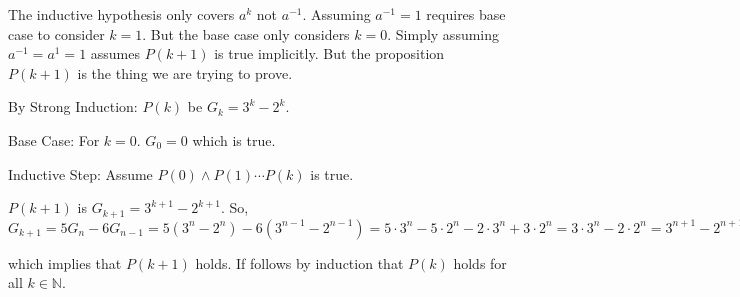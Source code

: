 \documentclass[titlepage,12pt]{book}
\begin{document}
\begin{solution}
    The inductive hypothesis only covers $a^{k}$ not $a^{-1}$.
    Assuming $a^{-1} = 1$ requires base case to consider $k = 1$.
    But the base case only considers $k = 0$.
    Simply assuming $a^{-1} = a^{1} = 1$ assumes $P(k + 1)$ is true implicitly.
    But the proposition $P(k + 1)$ is the thing we are trying to prove.
\end{solution}

\begin{solution}
    By Strong Induction:
    $P(k)$ be $G_{k} = 3^{k} - 2^{k}$.

    Base Case: For $k = 0$. $G_{0} = 0$ which is true.

    Inductive Step: Assume $P(0) \land P(1) \cdots P(k)$ is true.

    $P(k + 1)$ is $G_{k + 1} = 3^{k+1} - 2^{k + 1}$.
    So, $G_{k + 1} = 5 G_{n} - 6 G_{n - 1} 
    = 5 (3^{n} - 2^{n}) - 6 (3^{n - 1} - 2^{n - 1})
    = 5 \cdot 3^{n} - 5 \cdot 2^{n} - 2 \cdot 3^{n} + 3 \cdot 2^{n}
    = 3 \cdot 3^{n} - 2 \cdot 2^{n}
    = 3^{n + 1} - 2^{n + 1}
    $

    which implies that $P(k + 1)$ holds.
    If follows by induction that $P(k)$ holds for all $k \in \mathbb{N}$.


\end{solution}
\end{document}
